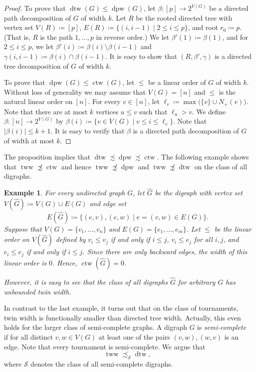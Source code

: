 \PassOptionsToPackage{dvipsnames,svgnames}{xcolor}\documentclass[10pt,a4paper]{article}
\newtheorem{example}{Example}[section]
\newcommand{\CS}{{\mathcal S}}
\newcommand{\bigmid}{\;\big|\;}
\DeclareMathOperator{\dtw}{dtw}
\DeclareMathOperator{\tww}{tww}
\DeclareMathOperator{\dpw}{dpw}
\DeclareMathOperator{\ctw}{ctw}
\begin{document}
\begin{proof}
 To prove that $\dtw(G) \leq \dpw(G)$, let $\beta\colon [p] \to 2^{V(G)}$ be a directed path decomposition of $G$ of width $k$.
 Let $R$ be the rooted directed tree with vertex set $V(R) \coloneqq [p]$, $E(R) \coloneqq \{(i,i-1) \mid 2 \leq i \leq p\}$, and root $r_0 \coloneqq p$.
 (That is, $R$ is the path $1,\ldots,p$ in reverse order.)
 We let $\beta'(1)\coloneqq \beta(1)$, and for $2 \leq i\leq p$, we let $\beta'(i) \coloneqq \beta(i) \setminus \beta(i-1)$ and $\gamma(i,i-1) \coloneqq \beta(i) \cap \beta(i-1)$.
 It is easy to show that $(R,\beta',\gamma)$ is a directed tree decomposition of $G$ of width $k$.

 To prove that $\dpw(G) \leq \ctw(G)$, let $\leq$ be a linear order of $G$ of width $k$.
 Without loss of generality we may assume that $V(G) = [n]$ and $\leq$ is the natural linear order on $[n]$.
 For every $v \in [n]$, let $\ell_v \coloneqq \max\big(\{v\} \cup N_+(v)\big)$.
 Note that there are at most $k$ vertices $u \leq v$ such that $\ell_u > v$.
 We define $\beta\colon [n] \to 2^{V(G)}$ by $\beta(i) \coloneqq \{v \in V(G) \mid v \leq i \leq \ell_v\}$.
 Note that $|\beta(i)| \leq k+1$.
 It is easy to verify that $\beta$ is a directed path decomposition of $G$ of width at most $k$.
\end{proof}

The proposition implies that $\dtw \precsim \dpw \precsim \ctw$.
The following example shows that $\tww \not\precsim \ctw$ and hence $\tww \not\precsim \dpw$ and $\tww \not\precsim \dtw$ on the class of all digraphs.

\begin{example}
 For every undirected graph $G$, let $\widehat G$ be the digraph with vertex set $V(\widehat G)\coloneqq V(G)\cup E(G)$ and edge set
 \[E(\widehat G) \coloneqq \big\{(e,v),(e,w) \bigmid e = (v,w) \in E(G)\big\}.\]
 Suppose that $V(G) = \{v_1,\dots,v_n\}$ and $E(G) = \{e_1,\dots,e_m\}$.
 Let $\leq$ be the linear order on $V(\widehat G)$ defined by $v_i \leq v_j$ if and only if $i \leq j$,
 $v_i \leq e_j$ for all $i,j$, and $e_i \leq e_j$ if and only if $i \leq j$.
 Since there are only backward edges, the width of this linear order is $0$.
 Hence, $\ctw(\widehat G)=0$.

 However, it is easy to see that the class of all digraphs $\widehat G$ for arbitrary $G$ has unbounded twin width.
\end{example}

In contrast to the last example, it turns out that on the class of tournaments, twin width is functionally smaller than directed tree width.
Actually, this even holds for the larger class of semi-complete graphs.
A digraph $G$ is \emph{semi-complete} if for all distinct $v,w \in V(G)$ at least one of the pairs $(v,w),(w,v)$ is an edge.
Note that every tournament is semi-complete.
We argue that
\begin{equation}
 \label{eq:tww-leq-dtw}
 \tww\precsim_{\CS}\dtw,
\end{equation}
where $\CS$ denotes the class of all semi-complete digraphs.
\end{document}
